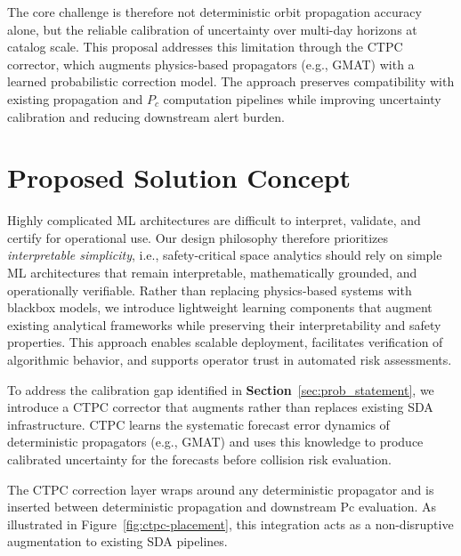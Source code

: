 \documentclass[10pt]{article}
\begin{document}
The core challenge is therefore not deterministic orbit propagation accuracy alone, but the reliable calibration of uncertainty over multi-day horizons at catalog scale. This proposal addresses this limitation through the CTPC corrector, which augments physics-based propagators (e.g., GMAT) with a learned probabilistic correction model. The approach preserves compatibility with existing propagation and $P_c$ computation pipelines while improving uncertainty calibration and reducing downstream alert burden.

\section{Proposed Solution Concept}

Highly complicated ML architectures are difficult to interpret, validate, and certify for operational use. Our design philosophy therefore prioritizes \textit{interpretable simplicity}, i.e., safety-critical space analytics should rely on simple ML architectures that remain interpretable, mathematically grounded, and operationally verifiable. Rather than replacing physics-based systems with blackbox models, we introduce lightweight learning components that augment existing analytical frameworks while preserving their interpretability and safety properties. This approach enables scalable deployment, facilitates verification of algorithmic behavior, and supports operator trust in automated risk assessments.

To address the calibration gap identified in \textbf{Section}~\ref{sec:prob_statement}, we introduce a CTPC corrector that augments rather than replaces existing SDA infrastructure. CTPC learns the systematic forecast error dynamics of deterministic propagators (e.g., GMAT) and uses this knowledge to produce calibrated uncertainty for the forecasts before collision risk evaluation.

The CTPC correction layer wraps around any deterministic propagator and is inserted between deterministic propagation and downstream Pc evaluation. As illustrated in Figure~\ref{fig:ctpc-placement}, this integration acts as a non-disruptive augmentation to existing SDA pipelines.
\end{document}
